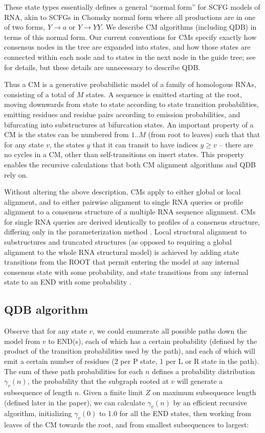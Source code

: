 \documentclass[11pt]{article}
\begin{document}
These state types essentially defines a general ``normal form'' for
SCFG models of RNA, akin to SCFGs in Chomsky normal form where all
productions are in one of two forms, $Y \rightarrow a$ or $Y
\rightarrow YY$. We describe CM algorithms (including QDB) in terms of
this normal form. Our current conventions for CMs specify exactly how
consensus nodes in the tree are expanded into states, and how those
states are connected within each node and to states in the next node
in the guide tree; see \cite{Eddy02b, infguide03} for details, but
these details are unnecessary to describe QDB.

Thus a CM is a generative probabilistic model of a family of
homologous RNAs, consisting of a total of $M$ states. A sequence is
emitted starting at the root, moving downwards from state to state
according to state transition probabilities, emitting residues and
residue pairs according to emission probabilities, and bifurcating
into substructures at bifurcation states. An important property of a
CM is the states can be numbered from $1..M$ (from root to leaves)
such that that for any state $v$, the states $y$ that it can transit
to have indices $y \geq v$ -- there are no cycles in a CM, other than
self-transitions on insert states.  This property enables the
recursive calculations that both CM alignment algorithms and QDB rely
on.

Without altering the above description, CMs apply to either global or
local alignment, and to either pairwise alignment to single RNA
queries or profile alignment to a consensus structure of a multiple
RNA sequence alignment. CMs for single RNA queries are derived
identically to profiles of a consensus structure, differing only in
the parameterization method \citep{KleinXXX}. Local structural
alignment to substructures and truncated structures (as opposed to
requiring a global alignment to the whole RNA structural model) is
achieved by adding state transitions from the ROOT that permit
entering the model at any internal consensus state with some
probability, and state transitions from any internal state to an END
with some probability \citep{KleinXXX}.

\subsection{QDB algorithm}

Observe that for any state $v$, we could enumerate all possible paths
down the model from $v$ to END(s), each of which has a certain
probability (defined by the product of the transition probabilities
used by the path), and each of which will emit a certain number of
residues (2 per P state, 1 per L or R state in the path). The sum of
these path probabilities for each $n$ defines a probability
distribution $\gamma_v(n)$, the probability that the subgraph rooted
at $v$ will generate a subsequence of length $n$.  Given a finite
limit $Z$ on maximum subsequence length (defined later in the paper),
we can calculate $\gamma_v(n)$ by an efficient recursive algorithm,
initializing $\gamma_{v}(0)$ to 1.0 for all the END states, then
working from leaves of the CM towards the root, and from smallest
subsequences to largest:
\end{document}
